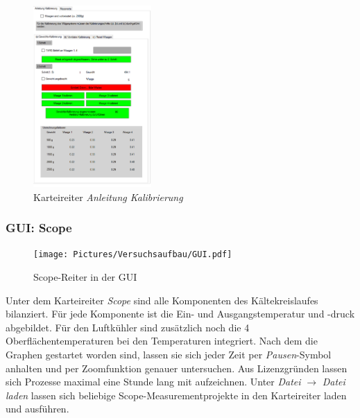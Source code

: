 \begin{figure}[htb]
\centering		\includegraphics[width=0.40\textwidth]{Pictures/GUI/AnleitungKalibrierung.png}
\caption{Karteireiter \textit{Anleitung Kalibrierung}}
\label{fig:AnleitungKalibrierung}
\end{figure}

\subsubsection*{GUI: Scope}

\begin{figure}[htb]
\centering		\texttt{[image: Pictures/Versuchsaufbau/GUI.pdf]}
\caption{Scope-Reiter in der GUI}
\label{fig:RI}
\end{figure}

Unter dem Karteireiter \textit{Scope} sind alle Komponenten des Kältekreislaufes bilanziert. Für jede Komponente ist die Ein- und Ausgangstemperatur und -druck abgebildet. Für den Luftkühler sind zusätzlich noch die 4 Oberflächentemperaturen bei den Temperaturen integriert. Nach dem die Graphen gestartet worden sind, lassen sie sich jeder Zeit per \textit{Pausen}-Symbol anhalten und per Zoomfunktion genauer untersuchen. 
Aus Lizenzgründen lassen sich Prozesse maximal eine Stunde lang mit aufzeichnen. 
Unter \textit{Datei} $\rightarrow$ \textit{Datei laden} lassen sich beliebige Scope-Measurementprojekte in den Karteireiter laden und ausführen. 